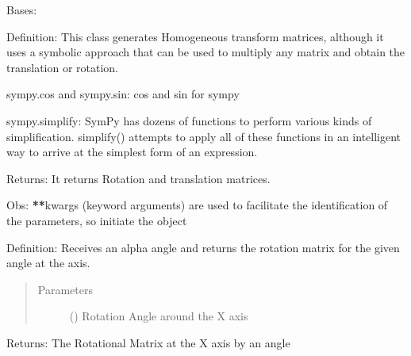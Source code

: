 \documentclass[letterpaper,10pt,english,openany,oneside]{sphinxmanual}
\begin{document}
\begin{fulllineitems}
\label{\detokenize{Forward_Kinematics:Forward_Kinematics.ForwardKinematics}}
Bases: 

Definition: This class generates Homogeneous transform matrices, although it uses a symbolic approach
that can be used to multiply any matrix and obtain the translation or rotation.

sympy.cos and sympy.sin: cos and sin for sympy

sympy.simplify: SymPy has dozens of functions to perform various kinds of simplification.
simplify() attempts to apply all of these functions
in an intelligent way to arrive at the simplest form of an expression.

Returns: It returns Rotation and translation matrices.

Obs: {\color{red}\bfseries{}**}kwargs (keyword arguments) are used to facilitate the identification of the parameters, so initiate the
object

\begin{fulllineitems}
\label{\detokenize{Forward_Kinematics:Forward_Kinematics.ForwardKinematics.rot_x}}
Definition: Receives an alpha angle and returns the rotation matrix for the given angle at the  axis.
\begin{quote}\begin{description}
\item[{Parameters}] \leavevmode
{} () \textendash{} Rotation Angle around the X axis

\end{description}\end{quote}

Returns: The Rotational Matrix at the X axis by an  angle

\end{fulllineitems}



\end{fulllineitems}
\end{document}
